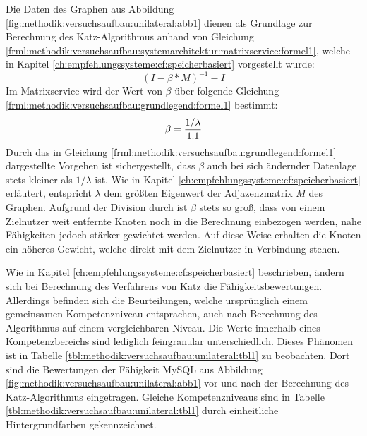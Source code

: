 Die Daten des Graphen aus Abbildung \ref{fig:methodik:versuchsaufbau:unilateral:abb1} dienen als Grundlage zur Berechnung des Katz-Algorithmus anhand von Gleichung \ref{frml:methodik:versuchsaufbau:systemarchitektur:matrixservice:formel1}, welche in Kapitel \ref{ch:empfehlungssysteme:cf:speicherbasiert} vorgestellt wurde:
\begin{equation}
	(I - \beta * M)^{-1} - I
	\label{frml:methodik:versuchsaufbau:systemarchitektur:matrixservice:formel1}
\end{equation}
Im Matrixservice wird der Wert von $\beta$ über folgende Gleichung \ref{frml:methodik:versuchsaufbau:grundlegend:formel1} bestimmt:
\begin{equation}
	\beta = \frac{1/\lambda}{1.1}
	\label{frml:methodik:versuchsaufbau:grundlegend:formel1}
\end{equation}
Durch das in Gleichung \ref{frml:methodik:versuchsaufbau:grundlegend:formel1} dargestellte Vorgehen ist sichergestellt, dass $\beta$ auch bei sich ändernder Datenlage stets kleiner als $1/\lambda$ ist. Wie in Kapitel \ref{ch:empfehlungssysteme:cf:speicherbasiert} erläutert, entspricht $\lambda$ dem größten Eigenwert der Adjazenzmatrix $M$ des Graphen. Aufgrund der Division durch \nenner ist $\beta$ stets so groß, dass von einem Zielnutzer weit entfernte Knoten noch in die Berechnung einbezogen werden, nahe Fähigkeiten jedoch stärker gewichtet werden. Auf diese Weise erhalten die Knoten ein höheres Gewicht, welche direkt mit dem Zielnutzer in Verbindung stehen.

Wie in Kapitel \ref{ch:empfehlungssysteme:cf:speicherbasiert} beschrieben, ändern sich bei Berechnung des Verfahrens von Katz die Fähigkeitsbewertungen. Allerdings befinden sich die Beurteilungen, welche ursprünglich einem gemeinsamen Kompetenzniveau entsprachen, auch nach Berechnung des Algorithmus auf einem vergleichbaren Niveau. Die Werte innerhalb eines Kompetenzbereichs sind lediglich feingranular unterschiedlich. Dieses Phänomen ist in Tabelle \ref{tbl:methodik:versuchsaufbau:unilateral:tbl1} zu beobachten. Dort sind die Bewertungen der Fähigkeit MySQL aus Abbildung \ref{fig:methodik:versuchsaufbau:unilateral:abb1} vor und nach der Berechnung des Katz-Algorithmus eingetragen. Gleiche Kompetenzniveaus sind in Tabelle \ref{tbl:methodik:versuchsaufbau:unilateral:tbl1} durch einheitliche Hintergrundfarben gekennzeichnet.


